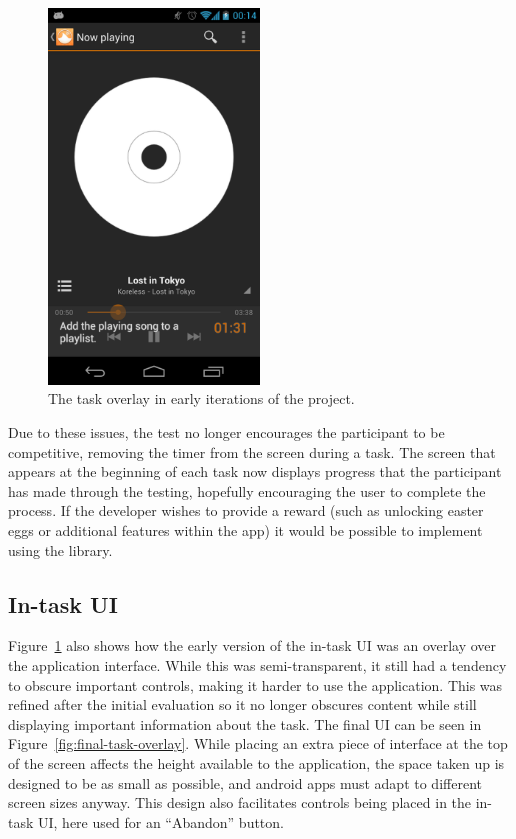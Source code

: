 \begin{figure}[ht!]
  \centering 
  \includegraphics[width=0.5\textwidth]{images/time-taken}
  \caption{The task overlay in early iterations of the project.}
  \label{fig:initial-overlay}
\end{figure}

Due to these issues, the test no longer encourages
the participant to be competitive, removing the timer from the screen during a task. The screen that appears at the beginning of each task now displays
progress that the participant has made through the testing, hopefully encouraging
the user to complete the process. If the developer wishes to provide a reward (such as
unlocking easter eggs or additional features within the app) it would be possible to implement using
the library.

\subsection{In-task UI}

Figure~\ref{fig:initial-overlay} also shows how the early version of the in-task UI was an overlay over the application interface. While this was semi-transparent, it still had a tendency to obscure important controls, making it harder to use the application. This was refined after the initial evaluation so it no longer obscures content while still displaying important information about the task. The final UI can be seen in Figure~\ref{fig:final-task-overlay}. While placing an extra piece of interface at the top of the screen affects the height available to the application, the space taken up is designed to be as small as possible, and android apps must adapt to different screen sizes anyway. This design also facilitates controls being placed in the in-task UI, here used for an ``Abandon'' button.


